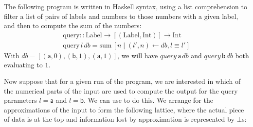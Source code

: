 \begin{example}
  \label{ex:introduction-example}
  The following program is written in Haskell \cite{haskell} syntax, using a list comprehension to filter a list of pairs of labels and numbers to those numbers with a given label, and then to compute the sum of the numbers:
  \begin{displaymath}
    \begin{array}{l}
      \mathrm{query} :: \mathrm{Label} \to [(\mathrm{Label}, \mathrm{Int})] \to \mathrm{Int} \\
      \mathrm{query}\,l\,\mathit{db} = \mathrm{sum}\,[ n \mid (l',n) \leftarrow \mathit{db}, l \equiv l' ]
    \end{array}
  \end{displaymath}
  With $\mathit{db} = [(\mathsf{a}, 0), (\mathsf{b}, 1), (\mathsf{a}, 1)]$, we will have $\mathit{query}\,\mathsf{a}\,\mathit{db}$ and $\mathit{query}\,\mathsf{b}\,\mathit{db}$ both evaluating to $1$.

  Now suppose that for a given run of the program, we are interested in which of the numerical parts of the input are used to compute the output for the query parameters $l = \mathsf{a}$ and $l = \mathsf{b}$. We can use \GPS to do this. We arrange for the approximations of the input to form the following lattice, where the actual piece of data is at the top and information lost by approximation is represented by $\bot$s:
  \begin{center}
\end{center}
\end{example}
